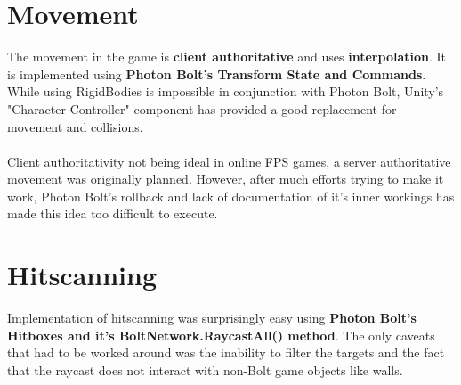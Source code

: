\documentclass[12pt,a4paper]{article}
\begin{document}
\section{Movement}
The movement in the game is \textbf{client authoritative} and uses \textbf{interpolation}. It is implemented using \textbf{Photon Bolt's Transform State and Commands}. While using RigidBodies is impossible in conjunction with Photon Bolt, Unity's "Character Controller" component has provided a good replacement for movement and collisions.\\\\
Client authoritativity not being ideal in online FPS games, a server authoritative movement was originally planned. However, after much efforts trying to make it work, Photon Bolt's rollback and lack of documentation of it's inner workings has made this idea too difficult to execute.

\section{Hitscanning}
Implementation of hitscanning was surprisingly easy using \textbf{Photon Bolt's Hitboxes and it's BoltNetwork.RaycastAll() method}. The only caveats that had to be worked around was the inability to filter the targets and the fact that the raycast does not interact with non-Bolt game objects like walls.
\newpage
\end{document}
